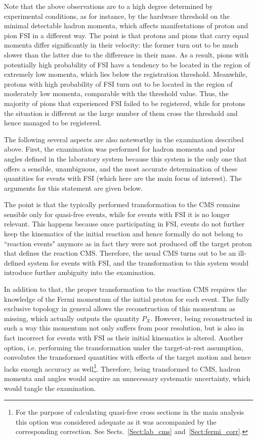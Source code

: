 Note that the above observations are to a high degree determined by experimental conditions, as for instance, by the hardware threshold on the minimal detectable hadron momenta, which affects manifestations of proton and pion FSI in a different way. The point is that protons and pions that carry equal momenta differ significantly in their velocity: the former turn out to be much slower than the latter due to the difference in their mass. As a result, pions with potentially high probability of FSI have a tendency to be located in the region of extremely low momenta, which lies below the registration threshold. Meanwhile, protons with high probability of FSI turn out to be located in the region of moderately low momenta, comparable with the threshold value. Thus, the majority of pions that experienced FSI failed to be registered, while for protons the situation is different as the large number of them cross the threshold and hence managed to be registered. 

The following several aspects are also noteworthy in the examination described above. First, the examination was performed for hadron momenta and polar angles defined in the laboratory system because this system is the only one that offers a sensible, unambiguous, and the most accurate determination of these quantities for events with FSI (which here are the main focus of interest). The arguments for this statement are given below.

The point is that the typically performed transformation to the CMS remains sensible only for quasi-free events, while for events with FSI it is no longer relevant. This happens because once participating in FSI, events do not further keep the kinematics of the initial reaction and hence formally do not belong to ``reaction events" anymore as in fact they were not produced off the target proton that defines the reaction CMS. Therefore, the usual CMS turns out to be an ill-defined system for events with FSI, and the transformation to this system would introduce further ambiguity into the examination. 

In addition to that, the proper transformation to the reaction CMS requires the knowledge of the Fermi momentum of the initial proton for each event. The fully exclusive topology in general allows the reconstruction of this momentum as missing, which actually outputs the quantity $P_{X}$. However, being reconstructed in such a way this momentum not only suffers from poor resolution, but is also in fact incorrect for events with FSI as their initial kinematics is altered. Another option, i.e. performing the transformation under the target-at-rest assumption, convolutes the transformed quantities with effects of the target motion and hence lacks enough accuracy as well\footnote[7]{For the purpose of calculating quasi-free cross sections in the main analysis this option was considered adequate as it was accompanied by the corresponding correction. See Sects.~\ref{Sect:lab_cms} and~\ref{Sect:fermi_corr}.}. Therefore, being transformed to CMS, hadron momenta and angles would acquire an unnecessary systematic uncertainty, which would tangle the examination.

